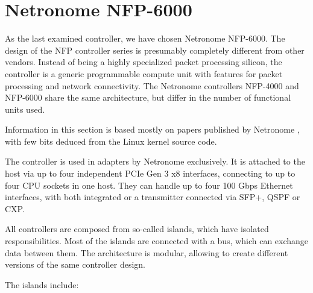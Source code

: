 \section{Netronome NFP-6000}


As the last examined controller, we have chosen Netronome NFP-6000. The design
of the NFP controller series is presumably completely different from other
vendors. Instead of being a highly specialized packet processing silicon, the
controller is a generic programmable compute unit with features for packet
processing and network connectivity. The Netronome controllers NFP-4000 and
NFP-6000 share the same architecture, but differ in the number of functional
units used.

Information in this section is based mostly on papers published by Netronome
\cite{nfp-4k-too,nfp-prm,nfp-micro-c}, with few bits deduced from the Linux
kernel source code.

The controller is used in adapters by Netronome exclusively. It is attached to
the host via up to four independent PCIe Gen 3 x8 interfaces, connecting to up
to four CPU sockets in one host. They can handle up to four 100 Gbps Ethernet
interfaces, with both integrated  or a transmitter connected via SFP+,
QSPF or CXP.

All controllers are composed from so-called islands, which have isolated
responsibilities. Most of the islands are connected with a bus, which can
exchange data between them. The architecture is modular, allowing to create
different versions of the same controller design.

The islands include:

